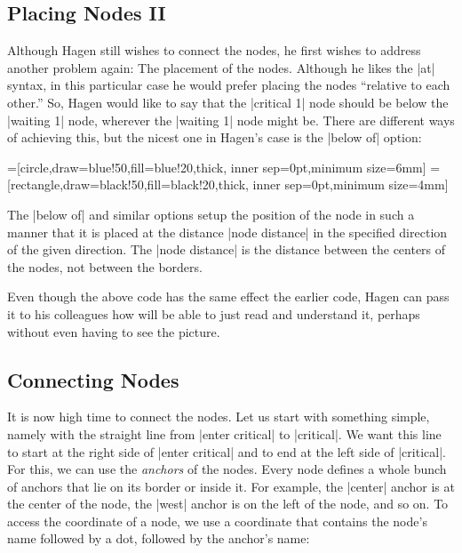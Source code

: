 \subsection{Placing Nodes II}

Although Hagen still wishes to connect the nodes, he first wishes to
address another problem again: The placement of the nodes. Although he
likes the |at| syntax, in this particular case he would prefer placing
the nodes ``relative to each other.'' So, Hagen would like to say that
the |critical 1| node should be below the |waiting 1| node, wherever
the |waiting 1| node might be. There are different ways of achieving
this, but the nicest one in Hagen's case is the |below of| option:

{
=[circle,draw=blue!50,fill=blue!20,thick,
                   inner sep=0pt,minimum size=6mm]
=[rectangle,draw=black!50,fill=black!20,thick,
                        inner sep=0pt,minimum size=4mm]
\begin{codeexample}[]
\end{codeexample}
}

The |below of| and similar options setup the position of the node in
such a manner that it is placed at the distance |node distance| in the
specified direction of the given direction. The |node distance| is the
distance between the centers of the nodes, not between the borders.

Even though the above code has the same effect the earlier code, Hagen
can pass it to his colleagues how will be able to just read and
understand it, perhaps without even having to see the picture.


\subsection{Connecting Nodes}

It is now high time to connect the nodes. Let us start with something
simple, namely with the straight line from |enter critical| to
|critical|. We want this line to start at the right side of
|enter critical| and to end at the left side of |critical|. For
this, we can use the \emph{anchors} of the nodes. Every node defines a
whole bunch of anchors that lie on its border or inside it. For
example, the |center| anchor is at the center of the node, the |west|
anchor is on the left of the node, and so on. To access the coordinate
of a node, we use a coordinate that contains the node's name followed
by a dot, followed by the anchor's name:

